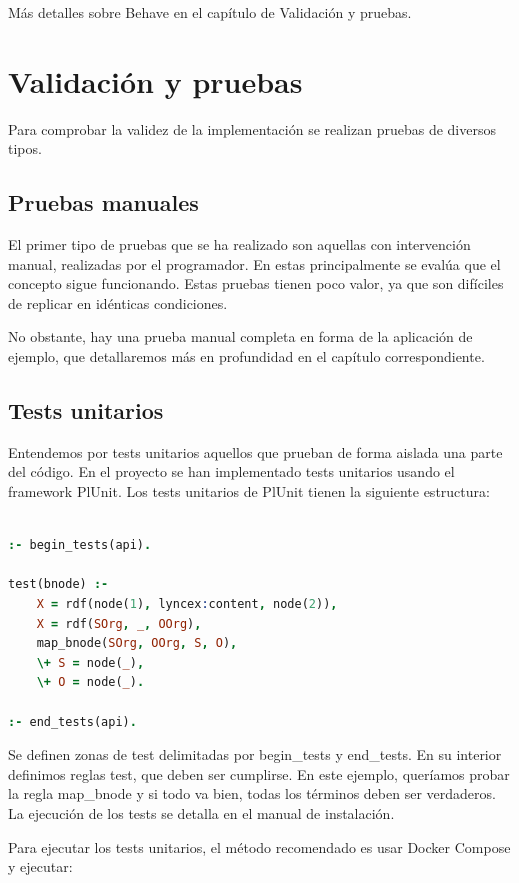 \documentclass[12pt]{report} %
\begin{document}
Más detalles sobre Behave en el capítulo de Validación y pruebas.


\chapter{Validación y pruebas}

Para comprobar la validez de la implementación se realizan pruebas de diversos tipos.

\section{Pruebas manuales}

El primer tipo de pruebas que se ha realizado son aquellas con intervención manual, realizadas por el programador. En estas principalmente se evalúa que el concepto sigue funcionando. Estas pruebas tienen poco valor, ya que son difíciles de replicar en idénticas condiciones.

No obstante, hay una prueba manual completa en forma de la aplicación de ejemplo, que detallaremos más en profundidad en el capítulo correspondiente.

\section{Tests unitarios}

Entendemos por tests unitarios aquellos que prueban de forma aislada una parte del código. En el proyecto se han implementado tests unitarios usando el framework PlUnit. Los tests unitarios de PlUnit tienen la siguiente estructura:

\begin{lstlisting}[language=Prolog]

:- begin_tests(api).

test(bnode) :-
    X = rdf(node(1), lyncex:content, node(2)),
    X = rdf(SOrg, _, OOrg),
    map_bnode(SOrg, OOrg, S, O),
    \+ S = node(_),
    \+ O = node(_).

:- end_tests(api).

\end{lstlisting}

Se definen zonas de test delimitadas por begin\_tests y end\_tests. En su interior definimos reglas test, que deben ser cumplirse. En este ejemplo, queríamos probar la regla map\_bnode y si todo va bien, todas los términos deben ser verdaderos. La ejecución de los tests se detalla en el manual de instalación.

Para ejecutar los tests unitarios, el método recomendado es usar Docker Compose y ejecutar:
\end{document}
